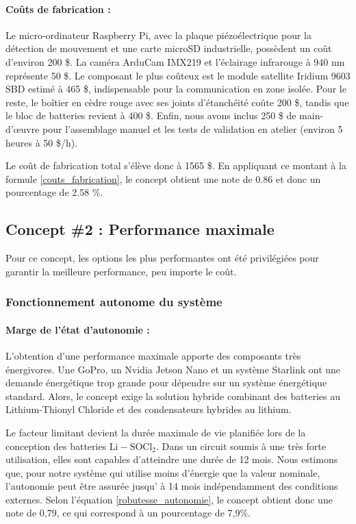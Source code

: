 \paragraph{Coûts de fabrication :}  
Le micro-ordinateur Raspberry Pi, avec la plaque piézoélectrique pour la détection de mouvement et une carte microSD industrielle, possèdent un coût d’environ 200 \$.
La caméra ArduCam IMX219 et l'éclairage infrarouge à 940 nm représente 50 \$. Le composant le plus coûteux est le module satellite Iridium 9603 SBD estimé à 465 \$, indispensable pour la communication en zone isolée.
Pour le reste, le boîtier en cèdre rouge avec ses joints d'étanchéité coûte 200 \$, tandis que le bloc de batteries revient à 400 \$. 
Enfin, nous avons inclus 250 \$ de main-d’œuvre pour l'assemblage manuel et les tests de validation en atelier (environ 5 heures à 50 \$/h).

\bigskip
Le coût de fabrication total s’élève donc à 1565 \$. En appliquant ce montant à la formule \ref{couts_fabrication}, le concept obtient une note de 0.86 et donc un pourcentage de 2.58 \%.



\subsection{Concept \#2 : Performance maximale}

Pour ce concept, les options les plus performantes ont été privilégiées pour garantir la meilleure performance, peu importe le coût.

\subsubsection{Fonctionnement autonome du système}

\paragraph{Marge de l'état d'autonomie :}
L’obtention d’une performance maximale apporte des composants très énergivores.
Une GoPro, un Nvidia Jetson Nano et un système Starlink ont une demande énergétique trop grande pour dépendre sur un système énergétique standard.
Alors, le concept exige la solution hybride combinant des batteries au Lithium-Thionyl Chloride et des condensateurs hybrides au lithium.
\bigskip

Le facteur limitant devient la durée maximale de vie planifiée lors de la conception des batteries $\mathrm{Li{-}SOCl_2}$.
Dans un circuit soumis à une très forte utilisation, elles sont capables d’atteindre une durée de 12 mois.
Nous estimons que, pour notre système qui utilise moins d’énergie que la valeur nominale, l’autonomie peut être assurée jusqu’ à 14 mois indépendamment des conditions externes.
Selon l’équation \ref{robutesse_autonomie}, le concept obtient donc une note de 0,79, ce qui correspond à un pourcentage de 7,9\%.


